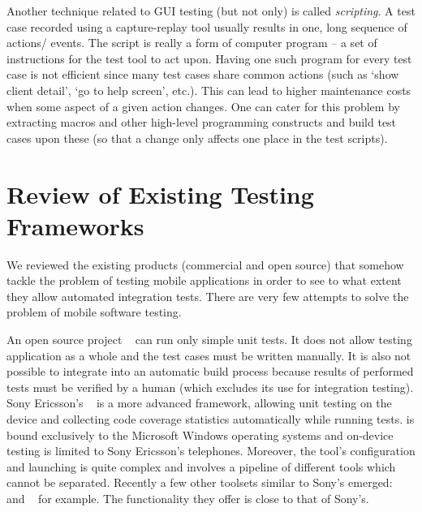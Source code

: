 Another technique related to GUI testing (but not only) is called \emph{scripting}. A test case 
recorded using a capture-replay tool usually results in one, long sequence of actions/ events.
The script is really a form of computer program -- a set of instructions for the test tool to act upon.
Having one such program for every test case is not efficient since many test cases share common actions
(such as `show client detail', `go to help screen', etc.). This can lead to higher maintenance costs 
when some aspect of a given action changes. One can cater for this problem by extracting macros and other high-level
programming constructs and build test cases upon these (so that a change only affects one place in the test
scripts).

\section{Review of Existing Testing Frameworks}

We reviewed the existing products (commercial and open source) that somehow tackle
the problem of testing mobile applications in order to see to what extent they allow automated
integration tests. There are very few attempts to solve the problem of mobile software testing.

An open source project ~ can run only simple unit tests. It does not allow
testing application as a whole and the test cases must be written manually. It is also not possible to
integrate  into an automatic build process because results of performed tests must be
verified by a human (which excludes its use for integration testing). 
%
Sony Ericsson's ~ is a more advanced framework, allowing unit testing on the device and
collecting code coverage statistics automatically while running tests. 
%
 is bound exclusively to the Microsoft Windows operating systems and on-device testing is limited to
Sony Ericsson's telephones. Moreover, the tool's configuration and launching is quite complex and 
involves a pipeline of different tools which cannot be separated. 
%
Recently a few other toolsets similar to Sony's emerged:
~ and ~ for example. The functionality they offer
is close to that of Sony's.

